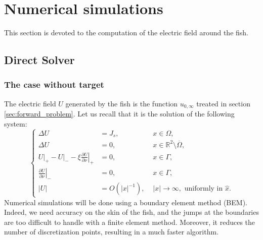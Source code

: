\section{Numerical simulations}

\label{sec:numeric-direct}

This section is devoted to the computation of the electric field
around the fish.

\subsection{Direct Solver}

\label{sub:direct-problem-numeric}

\subsubsection{The case without target}

The electric field $U$ generated by the fish is the function
$u_{0,\infty}$ treated in section \ref{sec:forward_problem}. Let
us recall that it is the solution of the following system:
\begin{equation}
\left\{ \begin{alignedat}{2}\Delta U & ={J_s}, & \,\, x\in\Omega,\\
\Delta U & =0, & \,\, x\in\mathbb{R}^{2}\setminus\overline{\Omega},\\
U\big|_+ - U\big|_- -\xi\left.\frac{\partial U}{\partial\nu}\right|_{+} & =0, & \,\, x\in\Gamma,\\
\left.\frac{\partial U}{\partial\nu}\right|_{-} & =0, & \,\, x\in\Gamma,\\
\left|U\right| & = {O}(\left|x\right|^{-1}), &
\,\,\left|x\right|\rightarrow\infty,\text{ uniformly in }\hat{x}.
\end{alignedat}
\right.\label{eq:sytem-U-developped}
\end{equation}
Numerical simulations will be done using a boundary element method
(BEM). Indeed, we need accuracy on the skin of the fish, and the
jumps at the boundaries are too difficult to handle with a finite
element method. Moreover, it reduces the number of discretization
points, resulting in a much faster algorithm.

